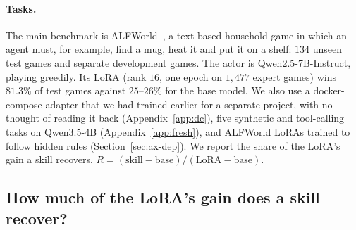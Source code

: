 \documentclass[11pt]{article}
\begin{document}
\paragraph{Tasks.} The main benchmark is ALFWorld~\cite{alfworld}, a text-based household game in which an agent must, for example, find a mug, heat it
and put it on a shelf: $134$ unseen test games and separate development games. The actor is Qwen2.5-7B-Instruct, playing greedily. Its LoRA (rank
$16$, one epoch on $1{,}477$ expert games) wins $81.3\%$ of test games against $25$--$26\%$ for the base model. We also use a docker-compose
adapter that we had trained earlier for a separate project, with no thought of reading it back (Appendix~\ref{app:dc}), five synthetic and tool-calling tasks on Qwen3.5-4B (Appendix~\ref{app:fresh}), and ALFWorld LoRAs
trained to follow hidden rules (Section~\ref{sec:ax-dep}). We report the share of the LoRA's gain a skill recovers,
$R=(\text{skill}-\text{base})/(\text{LoRA}-\text{base})$.

\subsection{How much of the LoRA's gain does a skill recover?}
\label{sec:ax-alf}
\end{document}
